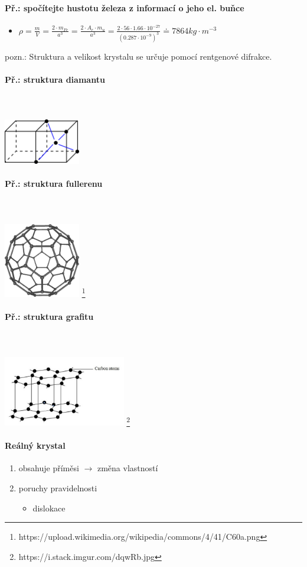 \paragraph{Př.: spočítejte hustotu železa z informací o jeho el. buňce}
\begin{itemize}
\item $\rho = \frac{m}{V} = \frac{2 \cdot m_{Fe} }{a^3} = \frac{2 \cdot A_r \cdot m_u }{a^3} = \frac{2 \cdot 56 \cdot 1.66 \cdot 10^{-27}}{(0.287 \cdot 10^{-9})^3} \doteq 7864kg \cdot m^{-3} $
\end{itemize}
pozn.: Struktura a velikost krystalu se určuje pomocí rentgenové difrakce. 

\paragraph{Př.: struktura diamantu}\mbox{}\\ \mbox{} \\
\includegraphics[width=0.25\textwidth]{pictures/002.png}

\paragraph{Př.: struktura fullerenu}\mbox{}\\ \mbox{} \\
\includegraphics[width=0.25\textwidth]{pictures/003.png}
\footnote{https://upload.wikimedia.org/wikipedia/commons/4/41/C60a.png}

\paragraph{Př.: struktura grafitu}\mbox{}\\ \mbox{} \\
\includegraphics[width=0.4\textwidth]{pictures/004.jpg}
\footnote{https://i.stack.imgur.com/dqwRb.jpg}


\paragraph{Reálný krystal}
\begin{enumerate}
\item obsahuje příměsi $\rightarrow$ změna vlastností
\item poruchy pravidelnosti
\begin{itemize}
\item dislokace
\end{itemize}
\end{enumerate}

